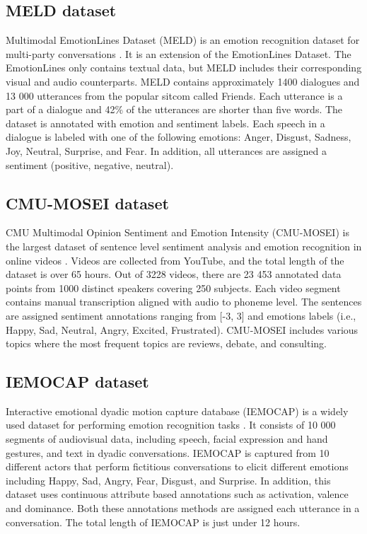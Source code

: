 \subsection{MELD dataset}
Multimodal EmotionLines Dataset (MELD) is an emotion recognition dataset for multi-party conversations \cite{meld_dataset}. It is an extension of the EmotionLines Dataset. The EmotionLines only contains textual data, but MELD includes their corresponding visual and audio counterparts. MELD contains approximately 1400 dialogues and 13 000 utterances from the popular sitcom called Friends. Each utterance is a part of a dialogue and 42\% of the utterances are shorter than five words. The dataset is annotated with emotion and sentiment labels. Each speech in a dialogue is labeled with one of the following emotions: Anger, Disgust, Sadness, Joy, Neutral, Surprise, and Fear. In addition, all utterances are assigned a sentiment (positive, negative, neutral). 

\subsection{CMU-MOSEI dataset}
CMU Multimodal Opinion Sentiment and Emotion Intensity (CMU-MOSEI) is the largest dataset of sentence level sentiment analysis and emotion recognition in online videos \cite{MSA_review2_GANDHI2023424} \cite{cmu-mosei_zadeh2018multimodal}. Videos are collected from YouTube, and the total length of the dataset is over 65 hours. Out of 3228 videos, there are 23 453 annotated data points from 1000 distinct speakers covering 250 subjects. Each video segment contains manual transcription aligned with audio to phoneme level. The sentences are assigned sentiment annotations ranging from [-3, 3] and emotions labels (i.e., Happy, Sad, Neutral, Angry, Excited, Frustrated). CMU-MOSEI includes various topics where the most frequent topics are reviews, debate, and consulting. 

\subsection{IEMOCAP dataset}
Interactive emotional dyadic motion capture database (IEMOCAP) is a widely used dataset for performing emotion recognition tasks \cite{iemocap_dataset}. It consists of 10 000 segments of audiovisual data, including speech, facial expression and hand gestures, and text in dyadic conversations. IEMOCAP is captured from 10 different actors that perform fictitious conversations to elicit different emotions including Happy, Sad, Angry, Fear, Disgust, and Surprise. In addition, this dataset uses continuous attribute based annotations such as activation, valence and dominance. Both these annotations methods are assigned each utterance in a conversation. The total length of IEMOCAP is just under 12 hours. 

